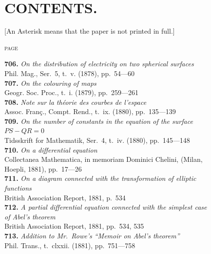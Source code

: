 \documentclass[12pt,a4paper,oneside]{book}
\begin{document}
\chapter*{CONTENTS.}

\begin{center}
\small [An Asterisk means that the paper is not printed in full.]
\end{center}

\vspace{0.5em}

\hfill\textsc{page}

\small
\noindent\textbf{706.} \textit{On the distribution of electricity on two spherical surfaces} \\
\hspace*{2em}Phil. Mag., Ser.~5, t.~v. (1878), pp.~54---60\\[0.4em]
\textbf{707.} \textit{On the colouring of maps} \\
\hspace*{2em}Geogr. Soc. Proc., t.~i. (1879), pp.~259---261\\[0.4em]
\textbf{708.} \textit{Note sur la th\'eorie des courbes de l'espace} \\
\hspace*{2em}Assoc. Fran\c{c}., Compt. Rend., t.~ix. (1880), pp.~135---139\\[0.4em]
\textbf{709.} \textit{On the number of constants in the equation of the surface}\\
\hspace*{2em}$PS - QR = 0$ \\
\hspace*{2em}Tidsskrift for Mathematik, Ser.~4, t.~iv. (1880), pp.~145---148\\[0.4em]
\textbf{710.} \textit{On a differential equation} \\
\hspace*{2em}Collectanea Mathematica, in memoriam Dominici Chelini, (Milan,\\
\hspace*{2em}Hoepli, 1881), pp.~17---26\\[0.4em]
\textbf{711.} \textit{On a diagram connected with the transformation of elliptic}\\
\hspace*{2em}\textit{functions} \\
\hspace*{2em}British Association Report, 1881, p.~534\\[0.4em]
\textbf{712.} \textit{A partial differential equation connected with the simplest case}\\
\hspace*{2em}\textit{of Abel's theorem} \\
\hspace*{2em}British Association Report, 1881, pp.~534, 535\\[0.4em]
\textbf{713.} \textit{Addition to Mr.~Rowe's ``Memoir on Abel's theorem''} \\
\hspace*{2em}Phil. Trans., t.~clxxii. (1881), pp.~751---758
\end{document}
